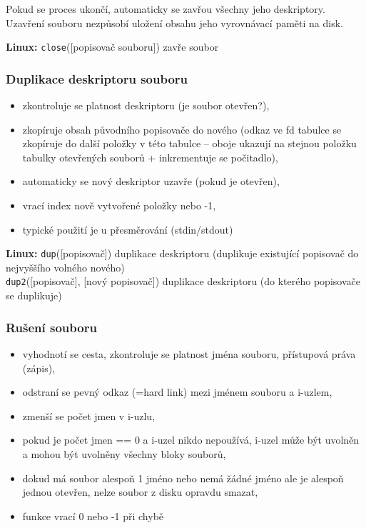 \documentclass[a4paper, 11pt]{article}
\newcommand{\tcmd}[1]{\texttt{#1}}
\begin{document}
Pokud se proces ukončí, automaticky se zavřou všechny jeho deskriptory. Uzavření souboru nezpůsobí uložení obsahu jeho vyrovnávací paměti na disk.
 
\textbf{Linux:}
\tcmd{close}([popisovač souboru]) zavře soubor

\subsubsection{Duplikace deskriptoru souboru}
\begin{itemize}
    \item zkontroluje se platnost deskriptoru (je soubor otevřen?),
    \item zkopíruje obsah původního popisovače do nového (odkaz ve fd tabulce se zkopíruje do další položky v této tabulce -- oboje ukazují na stejnou položku tabulky otevřených souborů + inkrementuje se počitadlo), 
    \item automaticky se nový deskriptor uzavře (pokud je otevřen),
    \item vrací index nově vytvořené položky nebo -1,
    \item typické použití je u přesměrování (stdin/stdout)
\end{itemize}
 
\textbf{Linux:}
\tcmd{dup}([popisovač]) duplikace deskriptoru (duplikuje existující popisovač do nejvyššího volného nového) \\[0.2em]
\tcmd{dup2}([popisovač], [nový popisovač]) duplikace deskriptoru (do kterého popisovače se duplikuje)

\subsubsection{Rušení souboru}
\begin{itemize}
    \item vyhodnotí se cesta, zkontroluje se platnost jména souboru, přístupová práva (zápis),
    \item odstraní se pevný odkaz (=hard link) mezi jménem souboru a i-uzlem,
    \item zmenší se počet jmen v i-uzlu,
    \item pokud je počet jmen == 0 a i-uzel nikdo nepoužívá, i-uzel může být uvolněn a mohou být uvolněny všechny bloky souborů,
    \item dokud má soubor alespoň 1 jméno nebo nemá žádné jméno ale je alespoň jednou otevřen, nelze soubor z disku opravdu smazat,
    \item funkce vrací 0 nebo -1 při chybě
\end{itemize}
 
\end{document}
